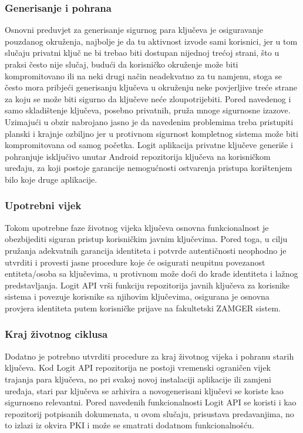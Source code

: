 \subsubsection{Generisanje i pohrana}
Osnovni preduvjet za generisanje sigurnog para ključeva je osiguravanje pouzdanog okruženja, najbolje je da tu aktivnost izvode sami korisnici, jer u tom slučaju privatni ključ ne bi trebao biti dostupan nijednoj trećoj strani, što u praksi često nije slučaj, budući da korisničko okruženje može biti kompromitovano ili na neki drugi način neadekvatno za tu namjenu, stoga se često mora pribjeći generisanju ključeva u okruženju neke povjerljive treće strane za koju se može biti sigurno da ključeve neće zloupotrijebiti. Pored navedenog i samo skladištenje ključeva, posebno privatnih, pruža mnoge sigurnosne izazove. Uzimajući u obzir nabrojano jasno je da navedenim problemima treba pristupiti planski i krajnje ozbiljno jer u protivnom sigurnost kompletnog sistema može biti kompromitovana od samog početka. Logit aplikacija privatne ključeve generiše i pohranjuje isključivo unutar Android repozitorija ključeva na korisničkom uređaju, za koji postoje garancije nemogućnosti ostvarenja pristupa korištenjem bilo koje druge aplikacije.

\subsubsection{Upotrebni vijek}
Tokom upotrebne faze životnog vijeka ključeva osnovna funkcionalnost je obezbijediti siguran pristup korisničkim javnim ključevima. Pored toga, u cilju pružanja adekvatnih garancija identiteta i potvrde autentičnosti neophodno je utvrditi i provesti jasne procedure koje će osigurati neupitnu povezanost entiteta/osoba sa ključevima, u protivnom može doći do krađe identiteta i lažnog predstavljanja. Logit API vrši funkciju repozitorija javnih ključeva za korisnike sistema i povezuje korisnike sa njihovim ključevima, osigurana je osnovna provjera identiteta putem korisničke prijave na fakultetski ZAMGER sistem.

\subsubsection{Kraj životnog ciklusa}
Dodatno je potrebno utvrditi procedure za kraj životnog vijeka i pohranu starih ključeva. Kod Logit API repozitorija ne postoji vremenski ograničen vijek trajanja para ključeva, no pri svakoj novoj instalaciji aplikacije ili zamjeni uređaja, stari par ključeva se arhivira a novogenerisani ključevi se koriste kao sigurnosno relevantni. Pored navedenih funkcionalnosti Logit API se koristi i kao repozitorij potpisanih dokumenata, u ovom slučaju, prisustava predavanjima, no to izlazi iz okvira PKI i može se smatrati dodatnom funkcionalnošću.

